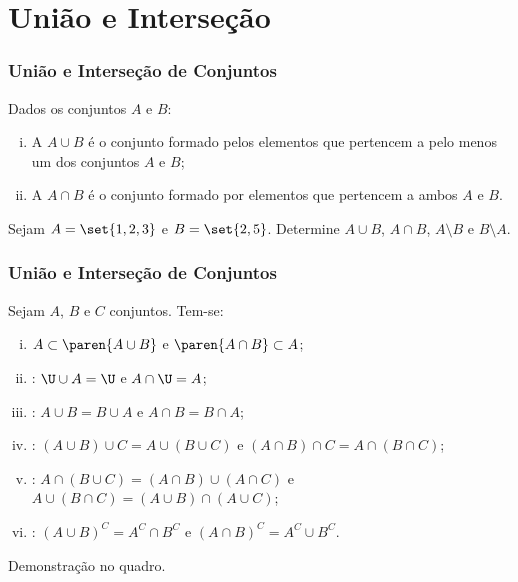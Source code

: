 \section{União e Interseção}


\begin{frame}
	\frametitle{União e Interseção de Conjuntos} %

	\begin{definicao}
	Dados os conjuntos $A$ e $B$:
	\begin{enumerate}[i.]
		\item A  $A \cup B$ é o conjunto formado pelos
		elementos que pertencem a pelo menos um dos conjuntos $A$ e $B$;
		\item A  $A \cap B$ é o conjunto formado por elementos que pertencem a ambos $A$ e
		$B$.
	\end{enumerate}
	\end{definicao}

	\begin{exemplo}
	Sejam $A = \set{1, 2, 3}$ e $ B = \set{2,5}$. Determine $A \cup B$,
	$A \cap B$, $A \setminus B$ e $B \setminus A$.
\end{exemplo}

\end{frame}


\begin{frame}
\frametitle{União e Interseção de Conjuntos} %
\begin{proposicao} \label{propuniaoint}
Sejam $A$, $B$ e $C$ conjuntos. Tem-se:
\begin{enumerate}[i.]
	\item $A \subset \paren{A \cup B}$ e $\paren{A \cap B} \subset A$;
	\item {}: $\U \cup A = \U$ e $A \cap \U = A$;
	\item {}: $A \cup B = B \cup A$ e $A \cap B = B \cap A$;
	\item {}: $\left(A \cup B \right) \cup C = A
	\cup \left( B \cup C \right)$ e $\left(A \cap B \right) \cap C = A
	\cap \left( B \cap C \right)$;

	\item {}: $A \cap
	\left( B \cup C \right) = \left(A \cap B \right) \cup \left( A \cap C
	\right)$ e $A \cup \left( B \cap C \right) = \left(A \cup B \right) \cap
	\left( A \cup C  \right)$;

	\item {}: $\left( A \cup B \right)^C = A^C \cap
	B^C$ e $\left(A \cap B \right)^C = A^C \cup B^C$.

	\end{enumerate}
\end{proposicao}

Demonstração no quadro.


\end{frame}